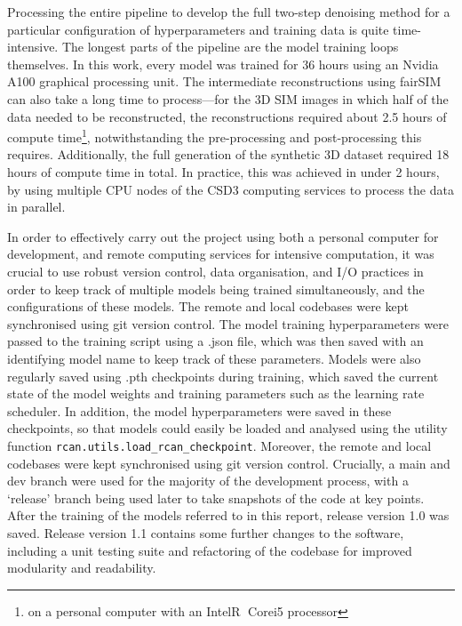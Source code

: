 \documentclass[12pt]{article}
\begin{document}
Processing the entire pipeline to develop the full two-step denoising method for a particular configuration of hyperparameters and training data is quite time-intensive.
The longest parts of the pipeline are the model training loops themselves.
In this work, every model was trained for 36 hours using an Nvidia A100 graphical processing unit.
The intermediate reconstructions using fairSIM can also take a long time to process---for the 3D SIM images in which half of the data needed to be reconstructed,
the reconstructions required about 2.5 hours of compute time\footnote{on a personal computer with an Intel\textcircled{R} Core\texttrademark i5 processor},
notwithstanding the pre-processing and post-processing this requires.
Additionally, the full generation of the synthetic 3D dataset required 18 hours of compute time in total.
In practice, this was achieved in under 2 hours, by using multiple CPU nodes of the CSD3 computing services to process the data in parallel.

In order to effectively carry out the project using both a personal computer for development,
and remote computing services for intensive computation,
it was crucial to use robust version control, data organisation, and I/O practices in order to keep track of multiple models being trained simultaneously,
and the configurations of these models.
The remote and local codebases were kept synchronised using git version control.
The model training hyperparameters were passed to the training script using a .json file,
which was then saved with an identifying model name to keep track of these parameters.
Models were also regularly saved using .pth checkpoints during training,
which saved the current state of the model weights and training parameters such as the learning rate scheduler.
In addition, the model hyperparameters were saved in these checkpoints,
so that models could easily be loaded and analysed using the utility function \texttt{rcan.utils.load\_rcan\_checkpoint}.
Moreover, the remote and local codebases were kept synchronised using git version control.
Crucially, a main and dev branch were used for the majority of the development process,
with a `release' branch being used later to take snapshots of the code at key points.
After the training of the models referred to in this report,
release version 1.0 was saved.
Release version 1.1 contains some further changes to the software,
including a unit testing suite and refactoring of the codebase for improved modularity and readability.
\end{document}
